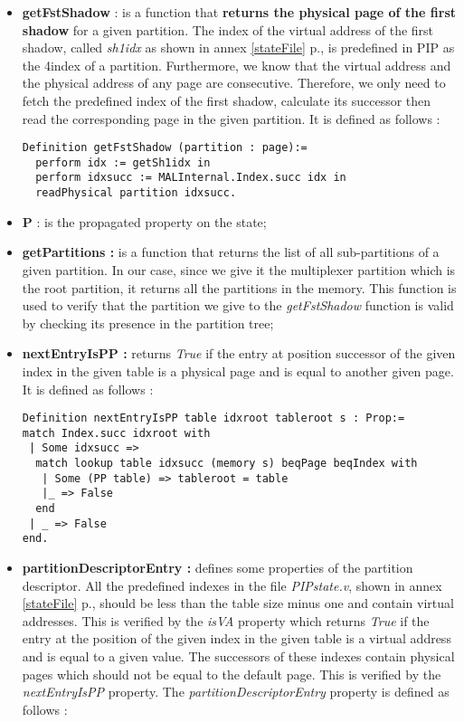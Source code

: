 \begin{itemize}
	\item \textbf{getFstShadow} : is a function that \textbf{returns the physical page of the first shadow} for a given partition. The index of the virtual address of the first shadow, called \textit{sh1idx} as shown in annex \ref{stateFile} p.\pageref{stateFile}, is predefined in PIP as the 4\rth index of a partition. Furthermore, we know that the virtual address and the physical address of any page are consecutive. Therefore, we only need to fetch the predefined index of the first shadow, calculate its successor then read the corresponding page in the given partition. It is defined as follows :
\begin{lstlisting}[caption = {getFstShadow function in the shallow embedding},label={getFstShallow}]
Definition getFstShadow (partition : page):=
  perform idx := getSh1idx in
  perform idxsucc := MALInternal.Index.succ idx in
  readPhysical partition idxsucc.
\end{lstlisting} 
\vspace{4pt}
	\item \textbf{P} : is the propagated property on the state;
	\item \textbf{getPartitions :}  is a function that returns the list of all sub-partitions of a given partition. In our case, since we give it the multiplexer partition which is the root partition, it returns all the partitions in the memory. This function is used to verify that the partition we give to the \textit{getFstShadow} function is valid by checking its presence in the partition tree;
	\item \textbf{nextEntryIsPP :}  returns \textit{True} if the entry at position successor of the given index in the given table is a physical page and is equal to another given page. It is defined as follows : \pagebreak
\begin{lstlisting}[caption = {nextEntryIsPP property},mathescape=true, xleftmargin=-.1\textwidth, xrightmargin=-.05\textwidth,label={nextEnt}]
Definition nextEntryIsPP table idxroot tableroot s : Prop:= 
match Index.succ idxroot with 
 | Some idxsucc => 
  match lookup table idxsucc (memory s) beqPage beqIndex with 
   | Some (PP table) => tableroot = table
   |_ => False 
  end
 | _ => False 
end.
\end{lstlisting} 
	\item \textbf{partitionDescriptorEntry :}  defines some properties of the partition descriptor. All the predefined indexes in the file \textit{PIPstate.v}, shown in annex \ref{stateFile} p.\pageref{stateFile}, should be less than the table size minus one and contain virtual addresses. This is verified by the \textit{isVA} property which returns \textit{True} if the entry at the position of the given index in the given table is a virtual address and is equal to a given value. The successors of these indexes contain physical pages which should not be equal to the default page. This is verified by the \textit{nextEntryIsPP} property. The \textit{partitionDescriptorEntry} property is defined as follows :

\end{itemize}
